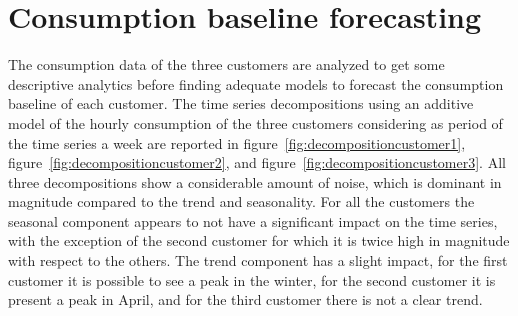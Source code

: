 \section{Consumption baseline forecasting} 
\label{sec:baselineval}
\vspace{0.2 cm}

The consumption data of the three customers are analyzed to get some descriptive analytics before finding adequate models to forecast the consumption baseline of each customer.
The time series decompositions using an additive model of the hourly consumption of the three customers considering as period of the time series a week are reported in figure~\ref{fig:decompositioncustomer1}, figure~\ref{fig:decompositioncustomer2}, and figure~\ref{fig:decompositioncustomer3}.
All three decompositions show a considerable amount of noise, which is dominant in magnitude compared to the trend and seasonality.
For all the customers the seasonal component appears to not have a significant impact on the time series, with the exception of the second customer for which it is twice high in magnitude with respect to the others.
The trend component has a slight impact, for the first customer it is possible to see a peak in the winter, for the second customer it is present a peak in April, and for the third customer there is not a clear trend.

